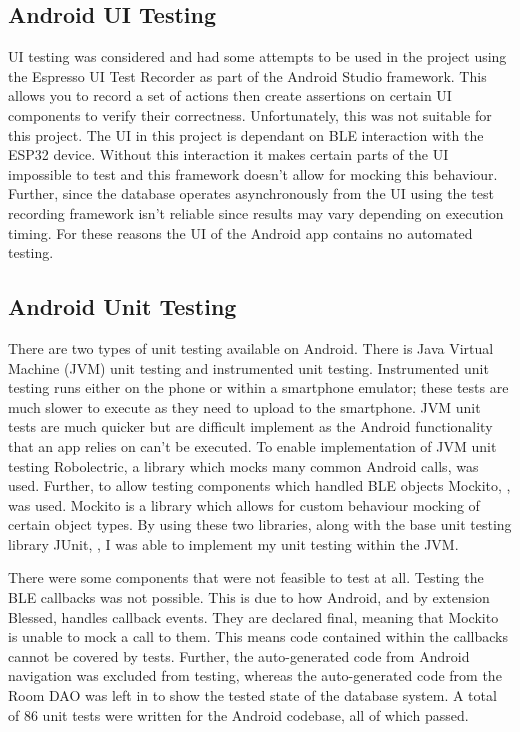\documentclass{l4proj}
\begin{document}
\subsection{Android UI Testing}

UI testing was considered and had some attempts to be used in the project using the Espresso UI Test Recorder as part of the Android Studio framework. This allows you to record a set of actions then create assertions on certain UI components to verify their correctness. Unfortunately, this was not suitable for this project. The UI in this project is dependant on BLE interaction with the ESP32 device. Without this interaction it makes certain parts of the UI impossible to test and this framework doesn't allow for mocking this behaviour. Further, since the database operates asynchronously from the UI using the test recording framework isn't reliable since results may vary depending on execution timing. For these reasons the UI of the Android app contains no automated testing.

\subsection{Android Unit Testing}

There are two types of unit testing available on Android. There is Java Virtual Machine (JVM) unit testing and instrumented unit testing. Instrumented unit testing runs either on the phone or within a smartphone emulator; these tests are much slower to execute as they need to upload to the smartphone. JVM unit tests are much quicker but are difficult implement as the Android functionality that an app relies on can't be executed. To enable implementation of JVM unit testing Robolectric, \citep{robolectric_robolectric_2019} a library which mocks many common Android calls, was used. Further, to allow testing components which handled BLE objects Mockito, \citep{faber_mockito_2020}, was used. Mockito is a library which allows for custom behaviour mocking of certain object types. By using these two libraries, along with the base unit testing library JUnit, \citep{junit_team_junit_2020}, I was able to implement my unit testing within the JVM.

There were some components that were not feasible to test at all. Testing the BLE callbacks was not possible. This is due to how Android, and by extension Blessed, handles callback events. They are declared final, meaning that Mockito is unable to mock a call to them. This means code contained within the callbacks cannot be covered by tests. Further, the auto-generated code from Android navigation was excluded from testing, whereas the auto-generated code from the Room DAO was left in to show the tested state of the database system. A total of 86 unit tests were written for the Android codebase, all of which passed.
\end{document}
